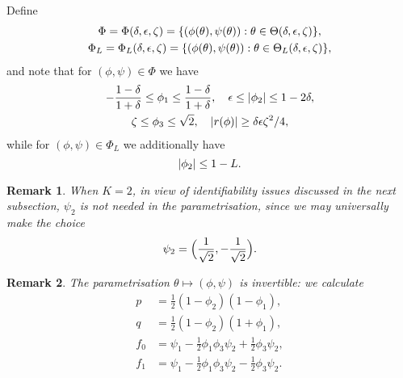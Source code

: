 \documentclass[journal]{IEEEtran}
\newtheorem{remark}{Remark}
\newcommand{\1}{\boldsymbol{1}}
\DeclarePairedDelimiter{\braces}{\{}{\}}
\DeclarePairedDelimiter{\brackets}{(}{)}
\DeclarePairedDelimiter{\abs}{\lvert}{\rvert}
\begin{document}
	Define
	\begin{gather*}
		\Phi=\Phi(\delta,\epsilon,\zeta)=\braces{(\phi(\theta),\psi(\theta)) : \theta\in \Theta(\delta,\epsilon,\zeta)},\\
		\Phi_{L}=\Phi_{L}(\delta,\epsilon,\zeta)
		=	\braces{(\phi(\theta),\psi(\theta)) : \theta \in \Theta_{L}(\delta,\epsilon,\zeta)},
	\end{gather*}
	and note that for $(\phi,\psi)\in \Phi$ we have
	\begin{multline}
          \label{eqn:phi-bounds}
          -\frac{1-\delta}{1+\delta} \leq \phi_1\leq \frac{1-\delta}{1+\delta},\quad %
          \epsilon\leq \abs{\phi_{2}}\leq 1-2\delta,\\ %
          \zeta\leq \phi_3\leq \sqrt{2},\quad %
          \abs{r(\phi)}\geq \delta\epsilon\zeta^2/4,
        \end{multline}
	while for $(\phi,\psi)\in \Phi_{L}$ we additionally have
	\begin{equation}\label{eqn:condition-on-phi2} \abs{\phi_2}\leq 1-L.
	\end{equation}
	\begin{remark}\label{rem:K=2}
		When $K=2$, in view of identifiability issues discussed in the next subsection, $\psi_2$ is not needed in the parametrisation, since we may universally make the choice \[\psi_2=\brackets[\Big]{\frac{1}{\sqrt{2}},-\frac{1}{\sqrt{2}}}.\]
	\end{remark}
	\begin{remark}\label{rem:invert-param}
		The parametrisation $\theta\mapsto (\phi,\psi)$ is invertible: we calculate
		\begin{align*}
			p&= \tfrac{1}{2} (1-\phi_2)(1-\phi_1), \\
			q &= \tfrac{1}{2}(1-\phi_2)(1+\phi_1),\\
			f_0 &=\psi_1-\tfrac{1}{2}\phi_1\phi_3\psi_2+\tfrac{1}{2}\phi_3\psi_2,\\
			f_1 &=\psi_1-\tfrac{1}{2}\phi_1\phi_3\psi_2-\tfrac{1}{2}\phi_3\psi_2.
		\end{align*}
	\end{remark}
\end{document}
